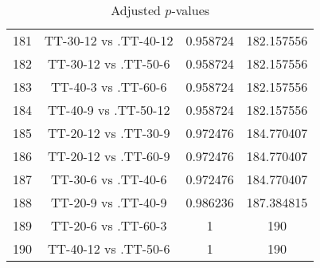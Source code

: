 \documentclass[a4paper,10pt]{article}
\begin{document}
\begin{landscape}
\begin{table}[!htp]
\begin{tabular}{cccc}
181&TT-30-12 vs .TT-40-12&0.958724&182.157556\\
182&TT-30-12 vs .TT-50-6&0.958724&182.157556\\
183&TT-40-3 vs .TT-60-6&0.958724&182.157556\\
184&TT-40-9 vs .TT-50-12&0.958724&182.157556\\
185&TT-20-12 vs .TT-30-9&0.972476&184.770407\\
186&TT-20-12 vs .TT-60-9&0.972476&184.770407\\
187&TT-30-6 vs .TT-40-6&0.972476&184.770407\\
188&TT-20-9 vs .TT-40-9&0.986236&187.384815\\
189&TT-20-6 vs .TT-60-3&1&190\\
190&TT-40-12 vs .TT-50-6&1&190\\
\hline
\end{tabular}
\caption{Adjusted $p$-values}
\end{table}

\end{landscape}
\end{document}
